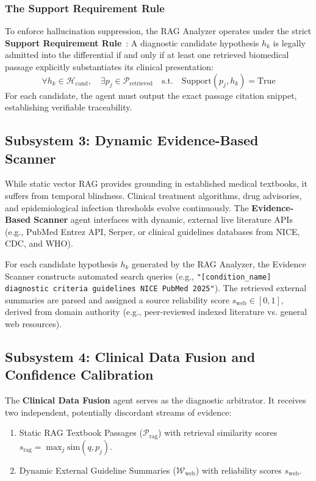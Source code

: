 \documentclass[conference]{IEEEtran}
\begin{document}
\subsubsection{The Support Requirement Rule}
To enforce hallucination suppression, the RAG Analyzer operates under the strict \textbf{Support Requirement Rule}~\cite{ogdu2025adaptive}: A diagnostic candidate hypothesis $h_k$ is legally admitted into the differential if and only if at least one retrieved biomedical passage explicitly substantiates its clinical presentation:
\begin{equation}
\forall h_k \in \mathcal{H}_{\text{cand}}, \quad \exists p_j \in \mathcal{P}_{\text{retrieved}} \quad \text{s.t.} \quad \text{Support}(p_j, h_k) = \text{True}
\end{equation}
For each candidate, the agent must output the exact passage citation snippet, establishing verifiable traceability.

\subsection{Subsystem 3: Dynamic Evidence-Based Scanner}
While static vector RAG provides grounding in established medical textbooks, it suffers from temporal blindness. Clinical treatment algorithms, drug advisories, and epidemiological infection thresholds evolve continuously. The \textbf{Evidence-Based Scanner} agent interfaces with dynamic, external live literature APIs (e.g., PubMed Entrez API, Serper, or clinical guidelines databases from NICE, CDC, and WHO).

For each candidate hypothesis $h_k$ generated by the RAG Analyzer, the Evidence Scanner constructs automated search queries (e.g., \texttt{"[condition\_name] diagnostic criteria guidelines NICE PubMed 2025"}). The retrieved external summaries are parsed and assigned a source reliability score $s_{\text{web}} \in [0, 1]$, derived from domain authority (e.g., peer-reviewed indexed literature vs. general web resources).

\subsection{Subsystem 4: Clinical Data Fusion and Confidence Calibration}
The \textbf{Clinical Data Fusion} agent serves as the diagnostic arbitrator. It receives two independent, potentially discordant streams of evidence:
\begin{enumerate}
    \item Static RAG Textbook Passages ($\mathcal{P}_{\text{rag}}$) with retrieval similarity scores $s_{\text{rag}} = \max_j \text{sim}(q, p_j)$.
    \item Dynamic External Guideline Summaries ($\mathcal{W}_{\text{web}}$) with reliability scores $s_{\text{web}}$.
\end{enumerate}
\end{document}
